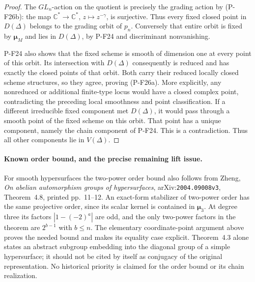 \documentclass[11pt,a4paper]{article}
\begin{document}
\begin{proof}
The $GL_n$-action on the quotient is precisely the grading
action by (P-F26b): the map $\mathbb C^*\to\mathbb C^*$,
$z\mapsto z^{-\gamma}$, is surjective. Thus every fixed
closed point in $D(\Delta)$ belongs to the grading orbit
of $p_n$. Conversely that entire orbit is fixed by
$\boldsymbol\mu_M$ and lies in $D(\Delta)$, by P-F24 and
discriminant nonvanishing.

P-F24 also shows that the fixed scheme is smooth of dimension
one at every point of this orbit. Its intersection with
$D(\Delta)$ consequently is reduced and has exactly the
closed points of that orbit. Both carry their reduced
locally closed scheme structures, so they agree, proving
(P-F26a). More explicitly, any nonreduced or additional
finite-type locus would have a closed complex point,
contradicting the preceding local smoothness and point
classification. If a different irreducible fixed component
met $D(\Delta)$, it would pass through a smooth point of
the fixed scheme on this orbit. That point has a unique
component, namely the chain component of P-F24. This is a
contradiction. Thus all other components lie in $V(\Delta)$.
\end{proof}

\paragraph{Known order bound, and the precise remaining lift issue.}
For smooth hypersurfaces the two-power order bound also follows
from Zheng, \emph{On abelian automorphism groups of hypersurfaces},
arXiv:\texttt{2004.09008v3}, Theorem~4.8, printed pp.~11--12.
An exact-form stabilizer of two-power order has the same
projective order, since its scalar kernel is contained in
$\boldsymbol\mu_3$.
At degree three its factors $|1-(-2)^a|$ are odd, and the only
two-power factors in the theorem are $2^{b-1}$ with $b\le n$.
The elementary coordinate-point argument above proves the needed
bound and makes its equality case explicit. Theorem~4.3 alone
states an abstract subgroup embedding into the diagonal group
of a simple hypersurface; it should not be cited by itself as
conjugacy of the original representation. No historical priority
is claimed for the order bound or its chain realization.
\end{document}

